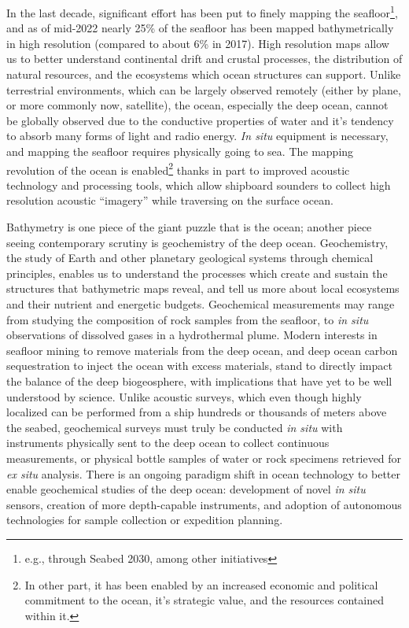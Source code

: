 In the last decade, significant effort has been put to finely mapping the seafloor\footnote{e.g., through Seabed 2030, among other initiatives}, and as of mid-2022 nearly 25\% of the seafloor has been mapped bathymetrically in high resolution (compared to about 6\% in 2017). 
High resolution maps allow us to better understand continental drift and crustal processes, the distribution of natural resources, and the ecosystems which ocean structures can support.
Unlike terrestrial environments, which can be largely observed remotely (either by plane, or more commonly now, satellite), the ocean, especially the deep ocean, cannot be globally observed due to the conductive properties of water and it's tendency to absorb many forms of light and radio energy.
\emph{In situ} equipment is necessary, and mapping the seafloor requires physically going to sea.
The mapping revolution of the ocean is enabled\footnote{In other part, it has been enabled by an increased economic and political commitment to the ocean, it's strategic value, and the resources contained within it.} thanks in part to improved acoustic technology and processing tools, which allow shipboard sounders to collect high resolution acoustic ``imagery'' while traversing on the surface ocean.

Bathymetry is one piece of the giant puzzle that is the ocean; another piece seeing contemporary scrutiny is geochemistry of the deep ocean.
Geochemistry, the study of Earth and other planetary geological systems through chemical principles, enables us to understand the processes which create and sustain the structures that bathymetric maps reveal, and tell us more about local ecosystems and their nutrient and energetic budgets. 
Geochemical measurements may range from studying the composition of rock samples from the seafloor, to \emph{in situ} observations of dissolved gases in a hydrothermal plume.
Modern interests in seafloor mining to remove materials from the deep ocean, and deep ocean carbon sequestration to inject the ocean with excess materials, stand to directly impact the balance of the deep biogeosphere, with implications that have yet to be well understood by science.
Unlike acoustic surveys, which even though highly localized can be performed from a ship hundreds or thousands of meters above the seabed, geochemical surveys must truly be conducted \emph{in situ} with instruments physically sent to the deep ocean to collect continuous measurements, or physical bottle samples of water or rock specimens retrieved for \emph{ex situ} analysis.
There is an ongoing paradigm shift in ocean technology to better enable geochemical studies of the deep ocean: development of novel \emph{in situ} sensors, creation of more depth-capable instruments, and adoption of autonomous technologies for sample collection or expedition planning. 


